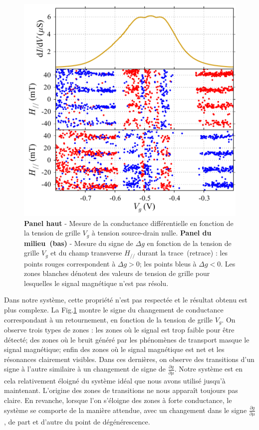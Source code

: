 \begin{figure}
\parbox{7cm}{
\includegraphics[scale=0.45]{Resultats/PointFonct/PointFonct.pdf} 
}
\parbox{6.5cm}{\caption{\textbf{Panel haut} - Mesure de la conductance différentielle en fonction de la tension de grille $V_g$ à tension source-drain nulle. \textbf{Panel du milieu~(bas)} - Mesure du signe de $\Delta g$ en fonction de la tension de grille $V_g$ et du champ transverse $H_{//}$ durant la trace~(retrace) : les points rouges correspondent à $\Delta g >0$; les points bleus à $\Delta g <0$. Les zones blanches dénotent des valeurs de tension de grille pour lesquelles le signal magnétique n'est pas résolu.}
\label{point_fonctio}
}
\end{figure}

Dans notre système, cette propriété n'est pas respectée et le résultat obtenu est plus complexe. La Fig.\ref{point_fonctio} montre le signe du changement de conductance correspondant à un retournement, en fonction de la tension de grille $V_g$. On observe trois types de zones : les zones où le signal est trop faible pour être détecté; des zones où le bruit généré par les phénomènes de transport masque le signal magnétique; enfin des zones où le signal magnétique est net et les résonances clairement visibles. Dans ces dernières, on observe des transitions d'un signe à l'autre similaire à un changement de signe de $\frac{\partial g}{\partial \mu}$. Notre système est en cela relativement éloigné du système idéal que nous avons utilisé jusqu'à maintenant. L'origine des zones de transitions ne nous apparaît toujours pas claire. En revanche, lorsque l'on s'éloigne des zones à forte conductance, le système se comporte de la manière attendue, avec un changement dans le signe $\frac{\partial g}{\partial \mu}$, de part et d'autre du point de dégénérescence.


